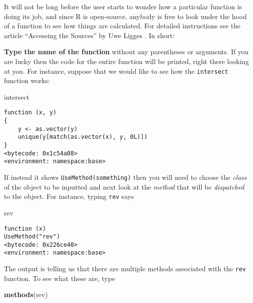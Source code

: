\documentclass[]{book}
\newenvironment{Shaded}{\begin{snugshade}}{\end{snugshade}}
\newcommand{\KeywordTok}[1]{\textcolor[rgb]{0.13,0.29,0.53}{\textbf{{#1}}}}
\newcommand{\NormalTok}[1]{{#1}}
\numberwithin{equation}{chapter}
\numberwithin{figure}{chapter}
\theoremstyle{plain}
\theoremstyle{definition}
\theoremstyle{remark}
\theoremstyle{definition}
\theoremstyle{definition}
\theoremstyle{remark}
\begin{document}
It will not be long before the user starts to wonder how a particular
function is doing its job, and since R is open-source, anybody is free
to look under the hood of a function to see how things are calculated.
For detailed instructions see the article ``Accessing the Sources'' by
Uwe Ligges \autocite{Ligges2006}. In short:

\textbf{Type the name of the function} without any parentheses or
arguments. If you are lucky then the code for the entire function will
be printed, right there looking at you. For instance, suppose that we
would like to see how the \texttt{intersect}
 function works:

\begin{Shaded}
\begin{Highlighting}[]
\NormalTok{intersect}
\end{Highlighting}
\end{Shaded}

\begin{verbatim}
function (x, y) 
{
    y <- as.vector(y)
    unique(y[match(as.vector(x), y, 0L)])
}
<bytecode: 0x1c54a08>
<environment: namespace:base>
\end{verbatim}

If instead it shows \texttt{UseMethod(something)}
 then you will need to choose the
\emph{class} of the object to be inputted and next look at the
\emph{method} that will be \emph{dispatched} to the object. For
instance, typing \texttt{rev}  says

\begin{Shaded}
\begin{Highlighting}[]
\NormalTok{rev}
\end{Highlighting}
\end{Shaded}

\begin{verbatim}
function (x) 
UseMethod("rev")
<bytecode: 0x226ce40>
<environment: namespace:base>
\end{verbatim}

The output is telling us that there are multiple methods associated with
the \texttt{rev} function. To see what these are, type

\begin{Shaded}
\begin{Highlighting}[]
\KeywordTok{methods}\NormalTok{(rev)}
\end{Highlighting}
\end{Shaded}
\end{document}
